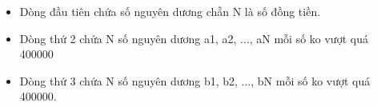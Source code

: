 \begin{itemize}
	\item Dòng đầu tiên chứa số nguyên dương chẵn N là số đồng tiền.
	\item Dòng thứ 2 chứa N số nguyên dương a1, a2, ..., aN mỗi số ko vượt quá 400000
	\item Dòng thứ 3 chứa N số nguyên dương b1, b2, ..., bN mỗi số ko vượt quá 400000.
\end{itemize}